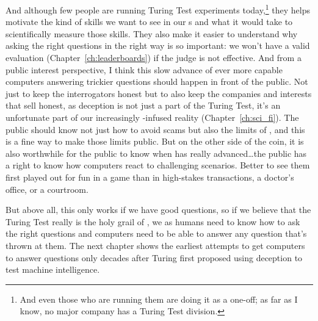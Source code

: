 And although few people are running Turing Test experiments
today,\footnote{And even those who are running them are doing it as a
  one-off; as far as I know, no major company has a Turing Test
  division.} they
helps motivate the kind of skills we want to see in our s and
what it would take to scientifically measure those skills.
%
They also make it easier to understand why asking the right questions in
the right way is so important: we won't have a valid evaluation
(Chapter~\ref{ch:leaderboards}) if the judge is not effective.
%
And from a public interest perspective, I think this slow advance of ever
more capable computers answering trickier questions should happen in
front of the public.
%
Not just to keep the interrogators honest but to also keep the
companies and interests that sell  honest, as deception is not
just a part of the Turing Test, it's an unfortunate part of our
increasingly -infused reality (Chapter~\ref{ch:sci_fi}).
%
The public should know not just how to avoid  scams but also the
limits of , and this is a fine way to make those limits public.
%
But on the other side of the coin, it is also worthwhile
for the public to know when  has really advanced\dots the public
has a right to know how computers react to challenging scenarios.
%
Better to see them first played out for fun in a game than in high-stakes
transactions, a doctor’s office, or a courtroom.

But above all, this only works if we have good questions, so if we
believe that the Turing Test really is the holy grail of , we
as humans need to know how to ask the right questions and computers
need to be able to answer any question that’s thrown at them.
%
The next chapter shows the earliest attempts to get computers to
answer questions only decades after Turing first proposed using
deception to test machine intelligence.
